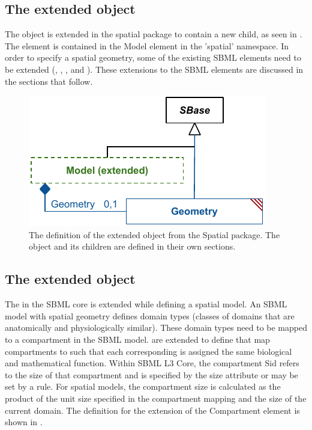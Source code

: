

\subsection{The extended \Model object}
\label{extended-model-class}
The \Model object is extended in the spatial package to contain a new \Geometry child, as seen in
. The \Geometry element is contained in the Model element in the 'spatial' namespace. In order to specify a spatial geometry, some of the existing SBML elements need to be extended (\Compartment, \Species, \Parameter, and \Reaction). These extensions to the SBML elements are discussed in the sections that follow.
 
\begin{figure}[ht]
  \includegraphics{figs/extended-model-uml}
  \caption{The definition of the extended \Model object from the Spatial package.  The \Geometry object and its children are defined in their own sections.}
  \label{model-uml}
\end{figure}




\subsection{The extended \Compartment object}
\label{extended-compartment-class}

The \Compartment in the SBML core is extended while defining a spatial model. An SBML model with spatial geometry defines domain types (classes of domains that are anatomically and physiologically similar). These domain types need to be mapped to a compartment in the SBML model. \Compartments are extended to define \CompartmentMappings that map compartments to \DomainTypes such that each corresponding \DomainType is assigned the same biological and mathematical function. Within SBML L3 Core, the compartment Sid refers to the size of that compartment and is specified by the size attribute or may be set by a rule.  For spatial models, the compartment size is calculated as the product of the unit size specified in the compartment mapping and the size of the current domain. The definition for the extension of the Compartment element is shown in .
 
